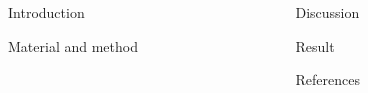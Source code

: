 \documentclass[
17pt,
  dvipdfmx,
  xcolor={svgnames},
  hyperref={colorlinks,citecolor=DeepPink4,linkcolor=DarkRed,urlcolor=DarkBlue}
  ]{beamer}
\begin{document}
\vspace{10mm}

\begin{columns}[T]
  \begin{column}{0.49\columnwidth}
    \begin{block}{\Large Introduction}
      \begin{flushleft}
        
      \end{flushleft}
    \end{block}

    \begin{block}{\Large Material and method}
      \begin{flushleft}
        
      \end{flushleft}
    \end{block}
  \end{column}

  \begin{column}{0.49\columnwidth}

    \begin{block}{\Large Discussion}
      \begin{flushleft}
        
      \end{flushleft}
    \end{block}

    \begin{block}{\Large Result}
      \begin{flushleft}
        
      \end{flushleft}
    \end{block}

    \begin{block}{\Large References}
      \begin{figure}
        \begin{flushleft}
          \beamertemplatetextbibitems
          
          
        \end{flushleft}
      \end{figure}
    \end{block}

  \end{column}

\end{columns}
\end{document}
